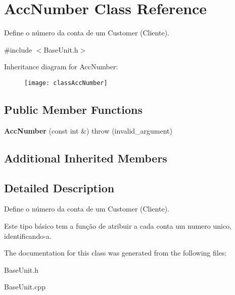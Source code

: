 \hypertarget{classAccNumber}{\section{Acc\-Number Class Reference}
\label{classAccNumber}
}


Define o número da conta de um Customer (Cliente).  




{\ttfamily \#include $<$Base\-Unit.\-h$>$}

Inheritance diagram for Acc\-Number\-:\begin{figure}[H]
\begin{center}
\leavevmode
\texttt{[image: classAccNumber]}
\end{center}
\end{figure}
\subsection*{Public Member Functions}
\begin{DoxyCompactItemize}
\item 
\hypertarget{classAccNumber_adf37dc081ad18a2a6968d9d0b9f92002}{{\bfseries Acc\-Number} (const int \&)  throw (invalid\-\_\-argument)}\label{classAccNumber_adf37dc081ad18a2a6968d9d0b9f92002}

\end{DoxyCompactItemize}
\subsection*{Additional Inherited Members}


\subsection{Detailed Description}
Define o número da conta de um Customer (Cliente). 

Este tipo básico tem a função de atribuir a cada conta um numero unico, identificando-\/a. 

The documentation for this class was generated from the following files\-:\begin{DoxyCompactItemize}
\item 
Base\-Unit.\-h\item 
Base\-Unit.\-cpp\end{DoxyCompactItemize}
